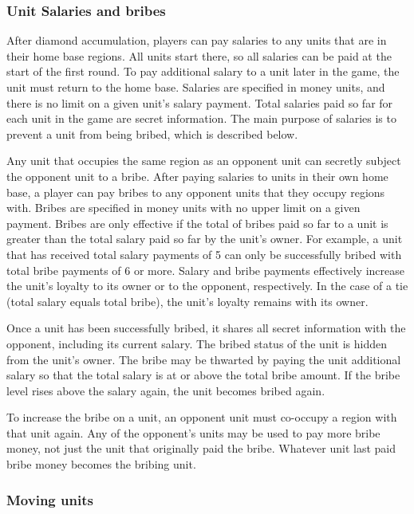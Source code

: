 \documentclass[12pt]{article}
\begin{document}
\subsubsection{Unit Salaries and bribes}

After diamond accumulation, players can pay salaries to any units that are in their home base regions.  All units start there, so all salaries can be paid at the start of the first round.  To pay additional salary to a unit later in the game, the unit must return to the home base.  Salaries are specified in money units, and there is no limit on a given unit's salary payment.  Total salaries paid so far for each unit in the game are secret information.  The main purpose of salaries is to prevent a unit from being bribed, which is described below.

Any unit that occupies the same region as an opponent unit can secretly subject the opponent unit to a bribe.  After paying salaries to units in their own home base, a player can pay bribes to any opponent units that they occupy regions with.  Bribes are specified in money units with no upper limit on a given payment.  Bribes are only effective if the total of bribes paid so far to a unit is greater than the total salary paid so far by the unit's owner.  For example, a unit that has received total salary payments of 5 can only be successfully bribed with total bribe payments of 6 or more.  Salary and bribe payments effectively increase the unit's loyalty to its owner or to the opponent, respectively.  In the case of a tie (total salary equals total bribe), the unit's loyalty remains with its owner. 

Once a unit has been successfully bribed, it shares all secret information with the opponent, including its current salary.  The bribed status of the unit is hidden from the unit's owner.  The bribe may be thwarted by paying the unit additional salary so that the total salary is at or above the total bribe amount.  If the bribe level rises above the salary again, the unit becomes bribed again. 

To increase the bribe on a unit, an opponent unit must co-occupy a region with that unit again.  Any of the opponent's units may be used to pay more bribe money, not just the unit that originally paid the bribe.  Whatever unit last paid bribe money becomes the bribing unit.

\subsubsection{Moving units}
\end{document}
